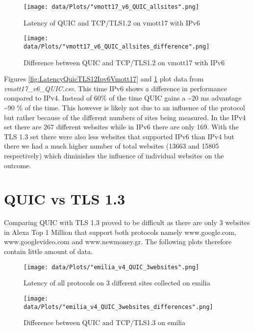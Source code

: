 \begin{figure}[!thb]
	\centering
	\begin{minipage}{.45\textwidth}
		\centering
		\texttt{[image: data/Plots/"vmott17\_v6\_QUIC\_allsites".png]}
		\caption{Latency of QUIC and TCP/TLS1.2 on vmott17 with IPv6}
  		\label{fig:LatencyQuicTLS12Ipv6Vmott17}
  	\end{minipage}%
  	\hspace{0.5cm}
  	\begin{minipage}{.45\textwidth}
  		\centering
  		\texttt{[image: data/Plots/"vmott17\_v6\_QUIC\_allsites\_difference".png]}
		\caption{Difference between QUIC and TCP/TLS1.2 on vmott17 with IPv6}
  		\label{fig:DiffQuicTLS12Ipv6Vmott17}
  	\end{minipage}
\end{figure}

Figures \ref{fig:LatencyQuicTLS12Ipv6Vmott17} and \ref{fig:DiffQuicTLS12Ipv6Vmott17} plot data from \textit{vmott17\_v6\_QUIC.csv}.
This time IPv6 shows a difference in performance compared to IPv4. Instead of 60\% of the time QUIC gains a \textasciitilde 20 ms advantage \textasciitilde 90 \% of the time.
This however is likely not due to an influence of the protocol but rather because of the different numbers of sites being measured.
In the IPv4 set there are 267 different websites while in IPv6 there are only 169.
With the TLS 1.3 set there were also less websites that supported IPv6 than IPv4 but there we had a much higher number of total websites (13663 and 15805 respectively) which diminishes the influence of individual websites on the outcome.


\section{QUIC vs TLS 1.3}
\label{section:QUIC_vs_TLS_1.3}

Comparing QUIC with TLS 1.3 proved to be difficult as there are only 3 websites in Alexa Top 1 Million that support both protocols namely www.google.com,\\
www.googlevideo.com and www.newmoney.gr.
The following plots therefore contain little amount of data.

\begin{figure}[!thb]
	\centering
	\begin{minipage}{.45\textwidth}
		\centering		
		\texttt{[image: data/Plots/"emilia\_v4\_QUIC\_3websites".png]}
		\caption{Latency of all protocols on 3 different sites collected on emilia}
  		\label{fig:LatencyAllProtocolsThreeSitesEmilia}
  	\end{minipage}%
  	\hspace{0.5cm}
  	\begin{minipage}{.45\textwidth}
		\centering
		\texttt{[image: data/Plots/"emilia\_v4\_QUIC\_3websites\_differences".png]}
		\caption{Difference between QUIC and TCP/TLS1.3 on emilia}
  		\label{fig:DiffQuicTLS13emilia}
		\end{minipage}
\end{figure}

